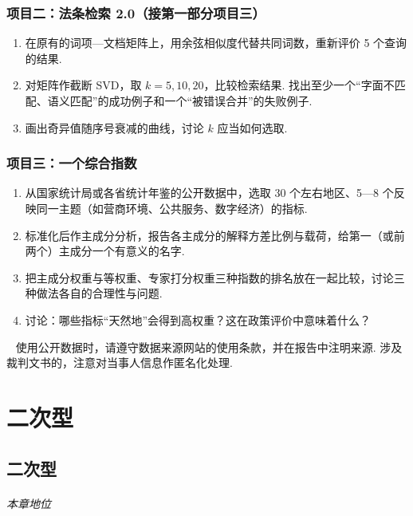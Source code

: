 \documentclass[lang=cn,10.5pt,scheme=chinese,toc=twocol,section,chinesefont=nofont,
twoside,citestyle=gb7714-2015,bibstyle=gb7714-2015]{elegantbook}
\newcommand*{\kaishu}{\CJKfamily{zhkai}}
\renewcommand*{\citshape}{\kaishu}
\numberwithin{equation}{section}   %
\newcommand*{\lnlabel}[1]{{\sffamily\bfseries\color{black}#1}}
\renewenvironment{note}{%
	\par\noindent\makebox[-3pt][r]{\scriptsize\color{black}\textdbend\quad}%
	\lnlabel{\notename}\ \citshape}{\par}
\begin{document}
\section*{项目二：法条检索 2.0（接第一部分项目三）}
\begin{enumerate}
  \item 在原有的词项—文档矩阵上，用余弦相似度代替共同词数，重新评价 5 个查询的结果.
  \item 对矩阵作截断 SVD，取 $k=5,10,20$，比较检索结果. 找出至少一个“字面不匹配、语义匹配”的成功例子和一个“被错误合并”的失败例子.
  \item 画出奇异值随序号衰减的曲线，讨论 $k$ 应当如何选取.
\end{enumerate}

\section*{项目三：一个综合指数}
\begin{enumerate}
  \item 从国家统计局或各省统计年鉴的公开数据中，选取 30 个左右地区、5—8 个反映同一主题（如营商环境、公共服务、数字经济）的指标.
  \item 标准化后作主成分分析，报告各主成分的解释方差比例与载荷，给第一（或前两个）主成分一个有意义的名字.
  \item 把主成分权重与等权重、专家打分权重三种指数的排名放在一起比较，讨论三种做法各自的合理性与问题.
  \item 讨论：哪些指标“天然地”会得到高权重？这在政策评价中意味着什么？
\end{enumerate}

\begin{note}
  使用公开数据时，请遵守数据来源网站的使用条款，并在报告中注明来源. 涉及裁判文书的，注意对当事人信息作匿名化处理.
\end{note}

\part{二次型}

\chapter{二次型}\label{ch:quadratic}

\paragraph*{本章地位}
\end{document}
